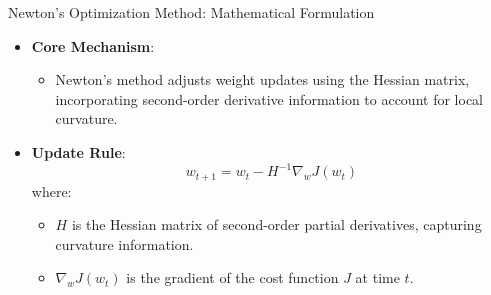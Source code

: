 \documentclass[serif, aspectratio=169]{beamer}
\begin{document}
\begin{frame}{Newton's Optimization Method: Mathematical Formulation}
    \begin{itemize}
        \item \textbf{Core Mechanism}:
        \begin{itemize}
            \item Newton's method adjusts weight updates using the Hessian matrix, incorporating second-order derivative information to account for local curvature.
        \end{itemize}

        \item \textbf{Update Rule}:
        \[
        w_{t+1} = w_t - H^{-1} \nabla_w J(w_t)
        \]
        where:
        \begin{itemize}
            \item \( H \) is the Hessian matrix of second-order partial derivatives, capturing curvature information.
            \item \( \nabla_w J(w_t) \) is the gradient of the cost function \( J \) at time \( t \).
        \end{itemize}
    \end{itemize}
\end{frame}
\end{document}

